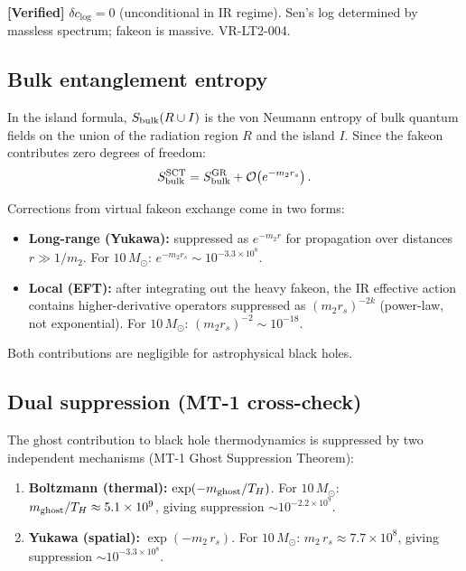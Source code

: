\documentclass[11pt,a4paper]{article}
\renewcommand{\order}{\mathcal{O}}
\theoremstyle{plain}
\theoremstyle{definition}
\newcommand{\verified}[1]{%
  \par\smallskip\noindent
  \colorbox{green!10}{\parbox{\dimexpr\linewidth-2\fboxsep}{%
    \textcolor{green!50!black}{\textbf{[Verified]}} #1}}%
  \par\smallskip}
\begin{document}
\verified{$\delta c_{\log} = 0$ (unconditional in IR regime).
  Sen's log determined by massless spectrum; fakeon is massive.
  VR-LT2-004.}

\subsection{Bulk entanglement entropy}

In the island formula, $S_{\rm bulk}(R \cup I)$ is the von Neumann
entropy of bulk quantum fields on the union of the radiation region $R$
and the island $I$.  Since the fakeon contributes zero degrees of
freedom:
\begin{equation}
S_{\rm bulk}^{\rm SCT} = S_{\rm bulk}^{\rm GR}
  + \order\!\left(e^{-m_2 r_s}\right).
\end{equation}

Corrections from virtual fakeon exchange come in two forms:
\begin{itemize}
\item \textbf{Long-range (Yukawa):} suppressed as $e^{-m_2 r}$ for
  propagation over distances $r \gg 1/m_2$.  For $10\,M_\odot$:
  $e^{-m_2 r_s} \sim 10^{-3.3\times 10^8}$.
\item \textbf{Local (EFT):} after integrating out the heavy fakeon,
  the IR effective action contains higher-derivative operators
  suppressed as $(m_2 r_s)^{-2k}$ (power-law, not exponential).
  For $10\,M_\odot$: $(m_2 r_s)^{-2} \sim 10^{-18}$.
\end{itemize}
Both contributions are negligible for astrophysical black holes.

\subsection{Dual suppression (MT-1 cross-check)}

The ghost contribution to black hole thermodynamics is suppressed
by two independent mechanisms (MT-1 Ghost Suppression Theorem):
\begin{enumerate}
\item \textbf{Boltzmann (thermal):} $\exp(-m_{\rm ghost}/T_H)$.
      For $10\,M_\odot$: $m_{\rm ghost}/T_H \approx 5.1 \times 10^{9}$,
      giving suppression $\sim 10^{-2.2\times 10^{9}}$.
\item \textbf{Yukawa (spatial):} $\exp(-m_2\,r_s)$.
      For $10\,M_\odot$: $m_2\,r_s \approx 7.7 \times 10^{8}$,
      giving suppression $\sim 10^{-3.3\times 10^{8}}$.
\end{enumerate}
\end{document}
